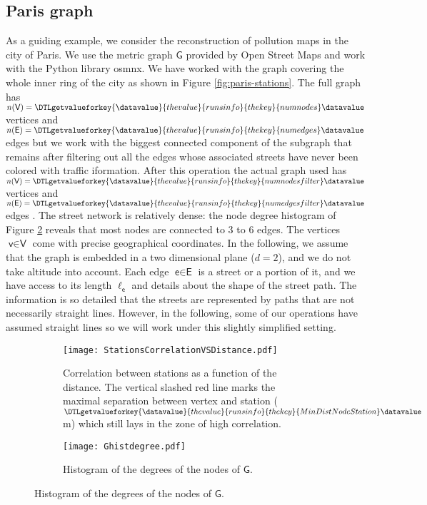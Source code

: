 \documentclass[11pt,a4paper,twoside]{article}
\newcommand{\perplexityinsert}[1]{\DTLgetvalueforkey{\datavalue}{thevalue}{runsinfo}{thekey}{#1}\datavalue}
\theoremstyle{definition}
\numberwithin{equation}{section}
\newcommand{\G}{\ensuremath{\textsf{G}}} %
\newcommand{\E}{\ensuremath{\textsf{E}}} %
\newcommand{\V}{\ensuremath{\textsf{V}}} %
\newcommand{\vv}{\ensuremath{\textsf{v}}}
\newcommand{\ee}{\ensuremath{\textsf{e}}}
\newcommand{\<}{\langle}
\renewcommand{\>}{\rangle}
\newcommand{\asmodif}[2]{{\color{teal} #1} {\sout{#2}}}
\begin{document}
\subsection{Paris graph}
\label{sec:paris-graph}

As a guiding example, we consider the reconstruction of pollution maps in the city of Paris. \asmodif{We use the metric graph $\G$ provided by Open Street Maps and work with the Python library osmnx. We have worked with the graph covering the whole inner ring of the city as shown in Figure \ref{fig:paris-stations}. The full graph has $n(\V)=\perplexityinsert{numnodes}$ vertices and $n(\E)=\perplexityinsert{numedges}$ edges but we work with the biggest connected component of the subgraph that remains after filtering out all the edges whose associated streets have never been colored with traffic iformation. After this operation the actual graph used has $n(\V)=\perplexityinsert{numnodesfilter}$ vertices and $n(\E)=\perplexityinsert{numedgesfilter}$ edges}{}. The street network is relatively dense: the node degree histogram of Figure \ref{fig:degree-histogram} reveals that most nodes are connected to 3 to 6 edges. The vertices $\vv \in \V$ come with precise geographical coordinates. In the following, we assume that the graph is embedded in a two dimensional plane ($d=2$), and we do not take altitude into account. Each edge $\ee\in \E$ is a street or a portion of it, and we have access to its length $\ell_\ee$ and details about the shape of the street path. The information is so detailed that the streets are represented by paths that are not necessarily straight lines. However, in the following, some of our operations have assumed straight lines so we will work under this slightly simplified setting.

\begin{figure}
      \centering
      \begin{subfigure}[b]{0.48\textwidth}
          \centering
          \texttt{[image: StationsCorrelationVSDistance.pdf]}
          \caption{Correlation between stations as a function of the distance. The vertical slashed red line marks the maximal separation between vertex and station ($\perplexityinsert{MinDistNodeStation}$m) which still lays in the zone of high correlation.}
          \label{fig:correlation}
      \end{subfigure}
      \hfill
      \begin{subfigure}[b]{0.48\textwidth}
          \centering
			\texttt{[image: Ghistdegree.pdf]}
			\caption{Histogram of the degrees of the nodes of $\G$.}
          \label{fig:degree-histogram}
      \end{subfigure}
      \label{fig:stations-nodes}
 \end{figure}
\end{document}

